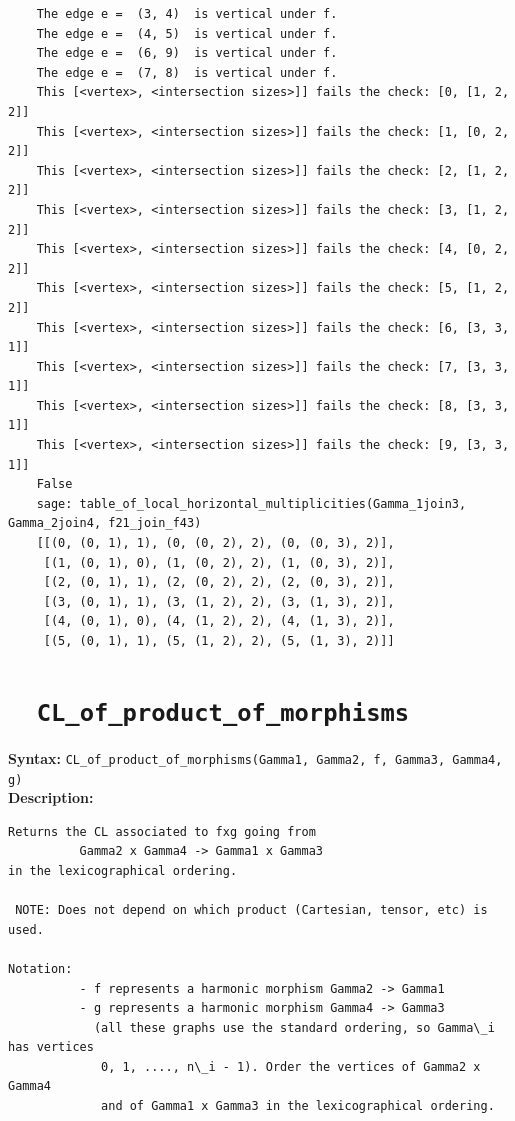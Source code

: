 \documentclass{article}
\begin{document}
{{\begin{verbatim}
    The edge e =  (3, 4)  is vertical under f.
    The edge e =  (4, 5)  is vertical under f.
    The edge e =  (6, 9)  is vertical under f.
    The edge e =  (7, 8)  is vertical under f.
    This [<vertex>, <intersection sizes>]] fails the check: [0, [1, 2, 2]]
    This [<vertex>, <intersection sizes>]] fails the check: [1, [0, 2, 2]]
    This [<vertex>, <intersection sizes>]] fails the check: [2, [1, 2, 2]]
    This [<vertex>, <intersection sizes>]] fails the check: [3, [1, 2, 2]]
    This [<vertex>, <intersection sizes>]] fails the check: [4, [0, 2, 2]]
    This [<vertex>, <intersection sizes>]] fails the check: [5, [1, 2, 2]]
    This [<vertex>, <intersection sizes>]] fails the check: [6, [3, 3, 1]]
    This [<vertex>, <intersection sizes>]] fails the check: [7, [3, 3, 1]]
    This [<vertex>, <intersection sizes>]] fails the check: [8, [3, 3, 1]]
    This [<vertex>, <intersection sizes>]] fails the check: [9, [3, 3, 1]]
    False
    sage: table_of_local_horizontal_multiplicities(Gamma_1join3, Gamma_2join4, f21_join_f43)                                                   
    [[(0, (0, 1), 1), (0, (0, 2), 2), (0, (0, 3), 2)],
     [(1, (0, 1), 0), (1, (0, 2), 2), (1, (0, 3), 2)],
     [(2, (0, 1), 1), (2, (0, 2), 2), (2, (0, 3), 2)],
     [(3, (0, 1), 1), (3, (1, 2), 2), (3, (1, 3), 2)],
     [(4, (0, 1), 0), (4, (1, 2), 2), (4, (1, 3), 2)],
     [(5, (0, 1), 1), (5, (1, 2), 2), (5, (1, 3), 2)]]
\end{verbatim}
}}
    
\section{\tt \ \ CL\_of\_product\_of\_morphisms}

\textbf{Syntax:} \verb}CL_of_product_of_morphisms(Gamma1, Gamma2, f, Gamma3, Gamma4, g)}\\

\textbf{Description:}
\begin{verbatim}
Returns the CL associated to fxg going from
          Gamma2 x Gamma4 -> Gamma1 x Gamma3
in the lexicographical ordering.

 NOTE: Does not depend on which product (Cartesian, tensor, etc) is used.

Notation:
          - f represents a harmonic morphism Gamma2 -> Gamma1
          - g represents a harmonic morphism Gamma4 -> Gamma3
            (all these graphs use the standard ordering, so Gamma\_i has vertices
             0, 1, ...., n\_i - 1). Order the vertices of Gamma2 x Gamma4 
             and of Gamma1 x Gamma3 in the lexicographical ordering.
\end{verbatim}
\end{document}
